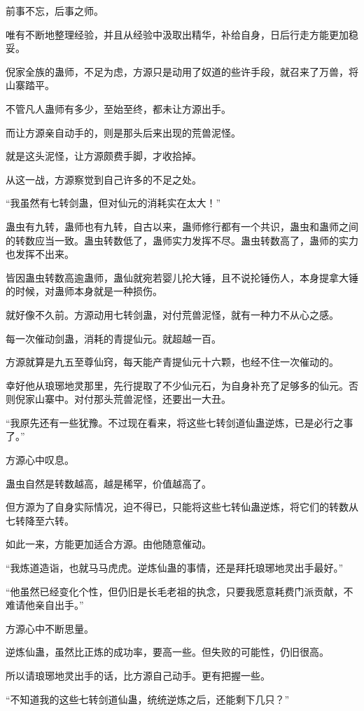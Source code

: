 \begin{this_body}
前事不忘，后事之师。

唯有不断地整理经验，并且从经验中汲取出精华，补给自身，日后行走方能更加稳妥。

倪家全族的蛊师，不足为虑，方源只是动用了奴道的些许手段，就召来了万兽，将山寨踏平。

不管凡人蛊师有多少，至始至终，都未让方源出手。

而让方源亲自动手的，则是那头后来出现的荒兽泥怪。

就是这头泥怪，让方源颇费手脚，才收拾掉。

从这一战，方源察觉到自己许多的不足之处。

“我虽然有七转剑蛊，但对仙元的消耗实在太大！”

蛊虫有九转，蛊师也有九转，自古以来，蛊师修行都有一个共识，蛊虫和蛊师之间的转数应当一致。蛊虫转数低了，蛊师实力发挥不尽。蛊虫转数高了，蛊师的实力也发挥不出来。

皆因蛊虫转数高逾蛊师，蛊仙就宛若婴儿抡大锤，且不说抡锤伤人，本身提拿大锤的时候，对蛊师本身就是一种损伤。

就好像不久前。方源动用七转剑蛊，对付荒兽泥怪，就有一种力不从心之感。

每一次催动剑蛊，消耗的青提仙元。就超越一百。

方源就算是九五至尊仙窍，每天能产青提仙元十六颗，也经不住一次催动的。

幸好他从琅琊地灵那里，先行提取了不少仙元石，为自身补充了足够多的仙元。否则倪家山寨中。对付那头荒兽泥怪，还要出一大丑。

“我原先还有一些犹豫。不过现在看来，将这些七转剑道仙蛊逆炼，已是必行之事了。”

方源心中叹息。

蛊虫自然是转数越高，越是稀罕，价值越高了。

但方源为了自身实际情况，迫不得已，只能将这些七转仙蛊逆炼，将它们的转数从七转降至六转。

如此一来，方能更加适合方源。由他随意催动。

“我炼道造诣，也就马马虎虎。逆炼仙蛊的事情，还是拜托琅琊地灵出手最好。”

“他虽然已经变化个性，但仍旧是长毛老祖的执念，只要我愿意耗费门派贡献，不难请他亲自出手。”

方源心中不断思量。

逆炼仙蛊，虽然比正炼的成功率，要高一些。但失败的可能性，仍旧很高。

所以请琅琊地灵出手的话，比方源自己动手。更有把握一些。

“不知道我的这些七转剑道仙蛊，统统逆炼之后，还能剩下几只？”


\end{this_body}
